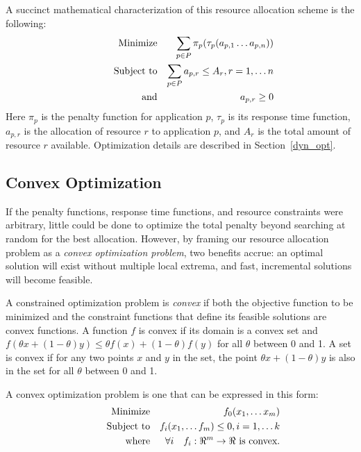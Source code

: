 A succinct mathematical characterization of this resource allocation scheme is the following:
\begin{eqnarray*}
& \makebox[1in][r]{Minimize}   & \sum_{p\in P} {\pi_p(\tau_p(a_{p,1}\ldots a_{p,n}))}  \\
& \makebox[1in][r]{Subject to} & \sum_{p\in P} a_{p,r} \leq A_r, r = 1,\ldots n        \\
& \makebox[1in][r]{and}        & a_{p,r} \geq 0
\end{eqnarray*}
Here $\pi_p$ is the penalty function for application $p$,
$\tau_p$ is its response time function,
$a_{p,r}$ is the allocation of resource $r$ to application $p$,
and $A_r$ is the total amount of resource $r$ available.  Optimization details are described in Section~\ref{dyn_opt}.

\subsection{Convex Optimization}

If the penalty functions, response time functions, and resource
constraints were arbitrary, little could be done to optimize the total
penalty beyond searching at random for the best allocation.  However,
by framing our resource allocation problem as a \emph{convex
  optimization problem}\cite{BoVa}, two benefits accrue: an optimal
solution will exist without multiple local extrema, and fast,
incremental solutions will become feasible.

A constrained optimization problem is \emph{convex} if both the objective function to be minimized
and the constraint functions that define its feasible solutions are convex functions.
A function $f$ is convex if its domain is a convex set and
$f(\theta x + (1-\theta)y) \leq \theta f(x) + (1-\theta)f(y)$
for all $\theta$ between 0 and 1.
A set is convex if for any two points $x$ and $y$ in the set, the point
$\theta x + (1-\theta)y$
is also in the set for all $\theta$ between 0 and 1.

A convex optimization problem is one that can be expressed in this form:
\begin{eqnarray*}
& \makebox[1in][r]{Minimize}   & f_0(x_1,\ldots x_m)                              \\
& \makebox[1in][r]{Subject to} & f_i(x_1,\ldots f_m) \leq 0, i = 1,\ldots k        \\
& \makebox[1in][r]{where}      & \forall i \quad f_i:\Re^m \rightarrow \Re \mbox{ is convex.}
\end{eqnarray*}


